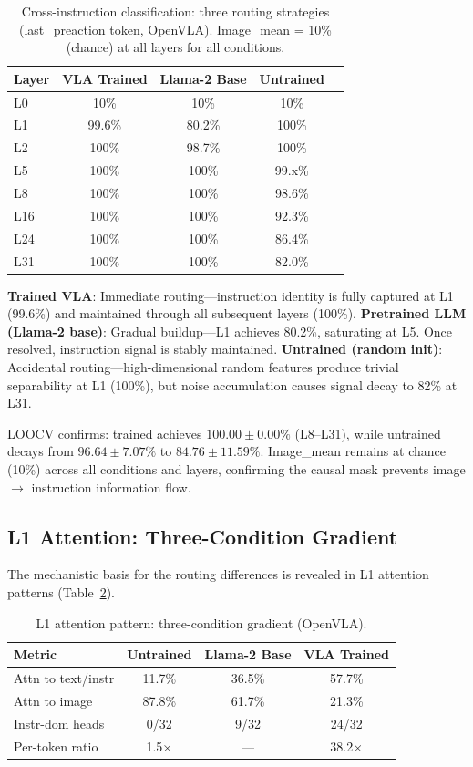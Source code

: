 \documentclass[10pt,twocolumn]{article}
\begin{document}
\begin{table}[t]
\centering
\caption{Cross-instruction classification: three routing strategies (last\_preaction token, OpenVLA). Image\_mean = 10\% (chance) at all layers for all conditions.}
\label{tab:probe}
\small
\begin{tabular}{lcccc}
\toprule
Layer & VLA Trained & Llama-2 Base & Untrained \\
\midrule
L0 & 10\% & 10\% & 10\% \\
L1 & 99.6\% & 80.2\% & 100\% \\
L2 & 100\% & 98.7\% & 100\% \\
L5 & 100\% & 100\% & 99.x\% \\
L8 & 100\% & 100\% & 98.6\% \\
L16 & 100\% & 100\% & 92.3\% \\
L24 & 100\% & 100\% & 86.4\% \\
L31 & 100\% & 100\% & 82.0\% \\
\bottomrule
\end{tabular}
\end{table}

\textbf{Trained VLA}: Immediate routing---instruction identity is fully captured at L1 (99.6\%) and maintained through all subsequent layers (100\%).
\textbf{Pretrained LLM (Llama-2 base)}: Gradual buildup---L1 achieves 80.2\%, saturating at L5. Once resolved, instruction signal is stably maintained.
\textbf{Untrained (random init)}: Accidental routing---high-dimensional random features produce trivial separability at L1 (100\%), but noise accumulation causes signal decay to 82\% at L31.

LOOCV confirms: trained achieves $100.00 \pm 0.00\%$ (L8--L31), while untrained decays from $96.64 \pm 7.07\%$ to $84.76 \pm 11.59\%$.
Image\_mean remains at chance (10\%) across all conditions and layers, confirming the causal mask prevents image $\to$ instruction information flow.

\subsection{L1 Attention: Three-Condition Gradient}
\label{sec:l1}

The mechanistic basis for the routing differences is revealed in L1 attention patterns (Table~\ref{tab:l1_attn}).

\begin{table}[t]
\centering
\caption{L1 attention pattern: three-condition gradient (OpenVLA).}
\label{tab:l1_attn}
\small
\begin{tabular}{lccc}
\toprule
Metric & Untrained & Llama-2 Base & VLA Trained \\
\midrule
Attn to text/instr & 11.7\% & 36.5\% & 57.7\% \\
Attn to image & 87.8\% & 61.7\% & 21.3\% \\
Instr-dom heads & 0/32 & 9/32 & 24/32 \\
Per-token ratio & 1.5$\times$ & --- & 38.2$\times$ \\
\bottomrule
\end{tabular}
\end{table}
\end{document}
